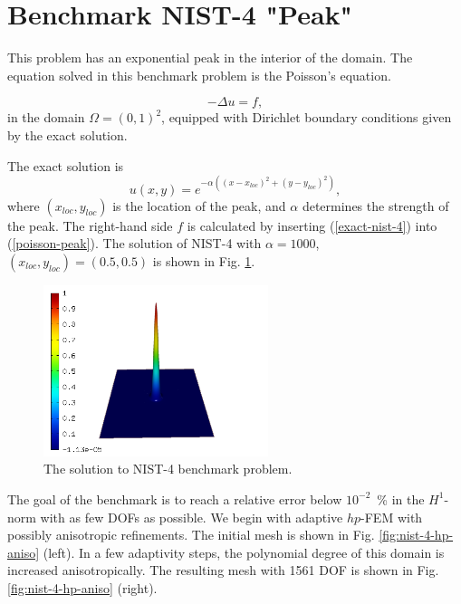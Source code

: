 \section{Benchmark NIST-4 "Peak"}
\label{sec:bench-4}

This problem has an exponential peak in the interior of the domain.
The equation solved in this benchmark problem is the Poisson's equation.

\begin{equation} \label{poisson-peak}
-\Delta u = f,
\end{equation}
in the domain $\Omega = (0, 1)^2$, equipped with Dirichlet
boundary conditions given by the exact solution.

The exact solution is 
\begin{equation}\label{exact-nist-4}
u(x,y) = e^{-\alpha ((x - x_{loc})^{2} + (y - y_{loc})^{2})},
\end{equation}
where $(x_{loc}, y_{loc})$ is the location of the peak, and $\alpha$ determines the strength of the peak.
The right-hand side $f$ is calculated by inserting (\ref{exact-nist-4}) into (\ref{poisson-peak}).
The solution of NIST-4 with $\alpha = 1000$, $(x_{loc}, y_{loc}) = (0.5, 0.5)$ is shown in Fig. \ref{fig:sln-nist04}.

\begin{figure}[!ht]
\centering
\includegraphics[height=5cm]{nist/nist-4/solution.png}
\caption{The solution to NIST-4 benchmark problem.}
\label{fig:sln-nist04}
\end{figure}

The goal of the benchmark is to reach a relative error below
$10^{-2}$~\% in the $H^1$-norm with as few DOFs as possible.
We begin with adaptive $hp$-FEM with possibly anisotropic refinements.
The initial mesh is shown in Fig. \ref{fig:nist-4-hp-aniso} (left).
In a few adaptivity steps, the polynomial degree of this domain is increased
anisotropically.
The resulting mesh with 1561 DOF is shown in Fig. \ref{fig:nist-4-hp-aniso} (right).

